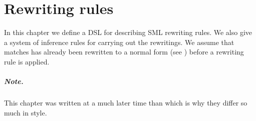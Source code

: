 \chapter{Rewriting rules}
In this chapter we define a DSL for describing SML rewriting rules. We also give
a system of inference rules for carrying out the rewritings. We assume that
matches has already been rewritten to a normal form (see )
before a rewriting rule is applied.

\paragraph{Note.} This chapter was written at a much later time than
 which is why they differ so much in style.








